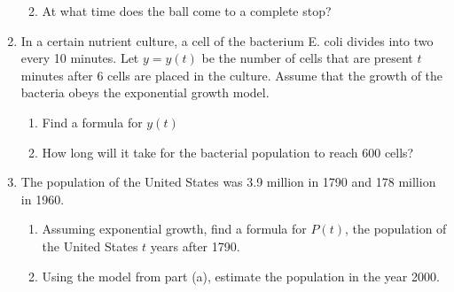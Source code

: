 \documentclass[12pt]{article}
\newif\ifans
\begin{document}
\begin{enumerate}
\begin{enumerate}
\ifans{\fbox{\parbox{1\linewidth}{Initial Value Problem:
$\left\{\begin{array}{l}
\frac{dv}{dt}=-2\sqrt{v}\\
\\
v(3)=16
\end{array}\right.$; Solution:
$v(t)=(7-t)^2$}}} \fi

\item At what time does the ball come to a complete stop?

\ifans{\fbox{The ball will stop at $t=7$ seconds.}} \fi

\end{enumerate}

\item In a certain nutrient culture, a cell of the bacterium E. coli divides into two every 10 minutes.  Let $y=y(t)$ be the number of cells that are present $t$ minutes after 6 cells are placed in the culture.  Assume that the growth of the bacteria obeys the exponential growth model.

\begin{enumerate}

\item Find a formula for $y(t)$

\ifans{\fbox{$y(t)=6(2)^{t/10}$}} \fi

\item How long will it take for the bacterial population to reach 600 cells?

\ifans{\fbox{$t=\frac{10\ln{(100)}}{\ln{2}}=10\log_2 100 \approx 66.64$ minutes}} \fi

\end{enumerate}

\item The population of the United States was 3.9 million in 1790 and 178 million in 1960.  

\begin{enumerate}

\item Assuming exponential growth, find a formula for $P(t)$, the population of the United States $t$ years after 1790.

\ifans{\fbox{$P(t)=3.9\left(\frac{1780}{39}\right)^{t/170}$}} \fi

\item Using the model from part (a), estimate the population in the year 2000.

\ifans{\fbox{$P(210) = 3.9 \left( \frac{1780}{39} \right)^{210/170} \approx437.38$ million people}} \fi


\end{enumerate}
\end{enumerate}
\end{document}
